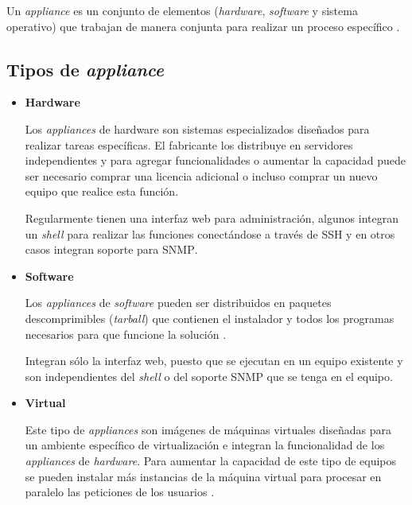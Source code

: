 Un \textit{appliance} es un conjunto de elementos (\emph{\gls{hardware}}, \emph{\gls{software}} y sistema operativo) que trabajan de manera conjunta para realizar un proceso espec\'{i}fico \cite{smith_linux_2007}.

    \subsection{Tipos de \textit{appliance}}

\begin{itemize}

  \item \textbf{Hardware}

Los \textit{appliances} de hardware son sistemas especializados dise\~{n}ados para realizar tareas espec\'{i}ficas. El fabricante los distribuye en servidores independientes y para agregar funcionalidades o aumentar la capacidad puede ser necesario comprar una licencia adicional o incluso comprar un nuevo equipo que realice esta funci\'{o}n.

Regularmente tienen una interfaz web para administraci\'{o}n, algunos integran un \emph{\gls{shell}} para realizar las funciones conect\'{a}ndose a trav\'{e}s de \textsc{\gls{SSH}} y en otros casos integran soporte para \textsc{SNMP}.

\newpage
  \item \textbf{Software}

Los \textit{appliances} de \emph{\gls{software}} pueden ser distribuidos en paquetes descomprimibles (\emph{\gls{tarball}}) que contienen el instalador y todos los programas necesarios para que funcione la soluci\'{o}n \cite{_bitnami:_????}.

Integran s\'{o}lo la interfaz web, puesto que se ejecutan en un equipo existente y son independientes del \emph{\gls{shell}} o del soporte \textsc{SNMP} que se tenga en el equipo.

  \item \textbf{Virtual}

Este tipo de \textit{appliances} son im\'{a}genes de m\'{a}quinas virtuales dise\~{n}adas para un ambiente espec\'{i}fico de virtualizaci\'{o}n e integran la funcionalidad de los \textit{appliances} de \emph{\gls{hardware}}. Para aumentar la capacidad de este tipo de equipos se pueden instalar m\'{a}s instancias de la m\'{a}quina virtual para procesar en paralelo las peticiones de los usuarios \cite{_why_????}.

\end{itemize}

